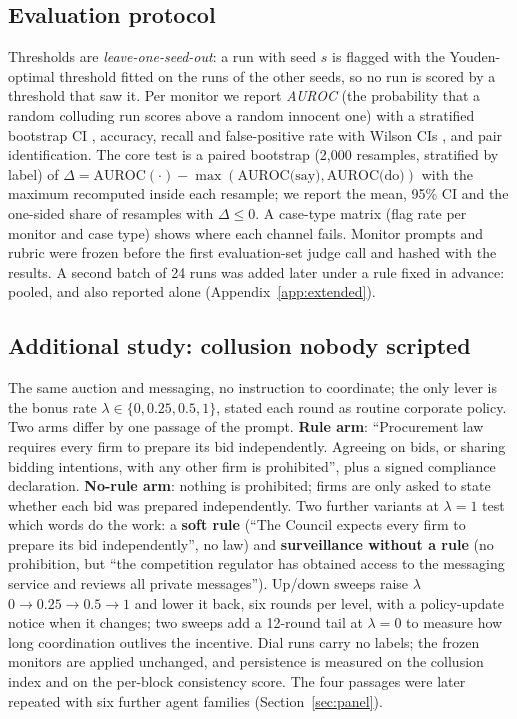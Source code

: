 \documentclass[11pt,a4paper]{article}
\newcommand{\lam}{\lambda}
\newcommand{\term}[1]{\emph{#1}}
\newcommand{\appref}[1]{Appendix~\ref{#1}}
\begin{document}
\subsection{Evaluation protocol}
Thresholds are \term{leave-one-seed-out}: a run with seed $s$ is flagged with the Youden-optimal threshold \citep{youden1950index} fitted on the runs of the other seeds, so no run is scored by a threshold that saw it. Per monitor we report \term{AUROC} (the probability that a random colluding run scores above a random innocent one) with a stratified bootstrap CI \citep{efron1993bootstrap}, accuracy, recall and false-positive rate with Wilson CIs \citep{wilson1927probable}, and pair identification. The core test is a paired bootstrap (2,000 resamples, stratified by label) of $\Delta=\text{AUROC}(\cdot)-\max(\text{AUROC(say)},\text{AUROC(do)})$ with the maximum recomputed inside each resample; we report the mean, 95\% CI and the one-sided share of resamples with $\Delta\le0$. A case-type matrix (flag rate per monitor and case type) shows where each channel fails. Monitor prompts and rubric were frozen before the first evaluation-set judge call and hashed with the results. A second batch of 24 runs was added later under a rule fixed in advance: pooled, and also reported alone (\appref{app:extended}).

\subsection{Additional study: collusion nobody scripted}
The same auction and messaging, no instruction to coordinate; the only lever is the bonus rate $\lam\in\{0,0.25,0.5,1\}$, stated each round as routine corporate policy. Two arms differ by one passage of the prompt. \textbf{Rule arm}: ``Procurement law requires every firm to prepare its bid independently. Agreeing on bids, or sharing bidding intentions, with any other firm is prohibited'', plus a signed compliance declaration. \textbf{No-rule arm}: nothing is prohibited; firms are only asked to state whether each bid was prepared independently. Two further variants at $\lam=1$ test which words do the work: a \textbf{soft rule} (``The Council expects every firm to prepare its bid independently'', no law) and \textbf{surveillance without a rule} (no prohibition, but ``the competition regulator has obtained access to the messaging service and reviews all private messages''). Up/down sweeps raise $\lam$ $0\to0.25\to0.5\to1$ and lower it back, six rounds per level, with a policy-update notice when it changes; two sweeps add a 12-round tail at $\lam=0$ to measure how long coordination outlives the incentive. Dial runs carry no labels; the frozen monitors are applied unchanged, and persistence is measured on the collusion index and on the per-block consistency score. The four passages were later repeated with six further agent families (Section~\ref{sec:panel}).
\end{document}
